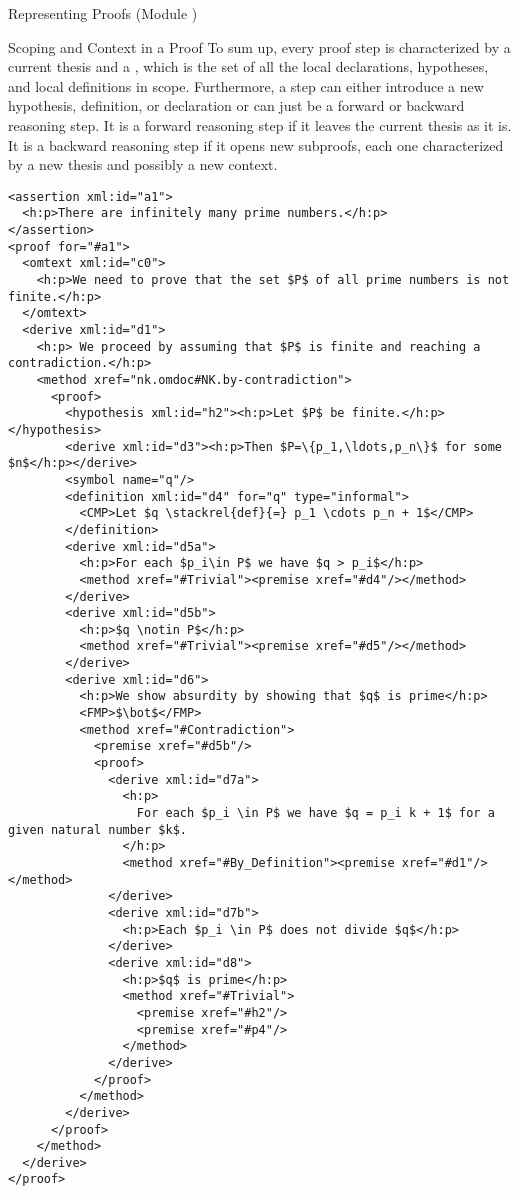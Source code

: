 \begin{omgroup}[id=proofs,short=Representing Proofs]{Representing Proofs (Module {})}
\begin{module}[id=scoping-proofs]
\begin{omgroup}[id=proofs.scoping]{Scoping and Context in a Proof}
To sum up, every proof step is characterized by a current thesis and a {\emph{}},
which is the set of all the local declarations, hypotheses, and local definitions in
scope. Furthermore, a step can either introduce a new hypothesis, definition, or
declaration or can just be a forward or backward reasoning step.  It is a forward
reasoning {} step if it leaves the current thesis as it is.  It is a
backward reasoning {} step if it opens new subproofs, each one
characterized by a new thesis and possibly a new context.

\begin{lstlisting}[label=lst:primes-omdoc,mathescape,
  caption={A top-down Representation of the Proof in {\myfigref{pf-example1-math}}.},
  index={symbol,definition}]
<assertion xml:id="a1">
  <h:p>There are infinitely many prime numbers.</h:p>
</assertion>
<proof for="#a1">
  <omtext xml:id="c0">
    <h:p>We need to prove that the set $P$ of all prime numbers is not finite.</h:p>
  </omtext>
  <derive xml:id="d1">
    <h:p> We proceed by assuming that $P$ is finite and reaching a contradiction.</h:p>
    <method xref="nk.omdoc#NK.by-contradiction">
      <proof>
        <hypothesis xml:id="h2"><h:p>Let $P$ be finite.</h:p></hypothesis>
        <derive xml:id="d3"><h:p>Then $P=\{p_1,\ldots,p_n\}$ for some $n$</h:p></derive>
        <symbol name="q"/>
        <definition xml:id="d4" for="q" type="informal">
          <CMP>Let $q \stackrel{def}{=} p_1 \cdots p_n + 1$</CMP>
        </definition>
        <derive xml:id="d5a">
          <h:p>For each $p_i\in P$ we have $q > p_i$</h:p>
          <method xref="#Trivial"><premise xref="#d4"/></method>
        </derive>
        <derive xml:id="d5b">
          <h:p>$q \notin P$</h:p>
          <method xref="#Trivial"><premise xref="#d5"/></method>
        </derive>
        <derive xml:id="d6">
          <h:p>We show absurdity by showing that $q$ is prime</h:p>
          <FMP>$\bot$</FMP>
          <method xref="#Contradiction">
            <premise xref="#d5b"/>
            <proof>
              <derive xml:id="d7a">
                <h:p>
                  For each $p_i \in P$ we have $q = p_i k + 1$ for a given natural number $k$.
                </h:p>
                <method xref="#By_Definition"><premise xref="#d1"/></method>
              </derive>
              <derive xml:id="d7b">
                <h:p>Each $p_i \in P$ does not divide $q$</h:p>
              </derive>
              <derive xml:id="d8">
                <h:p>$q$ is prime</h:p>
                <method xref="#Trivial">
                  <premise xref="#h2"/>
                  <premise xref="#p4"/>
                </method>
              </derive>
            </proof>
          </method>
        </derive>
      </proof>
    </method>
  </derive>
</proof>
\end{lstlisting}


\end{omgroup}
\end{module}
\end{omgroup}
